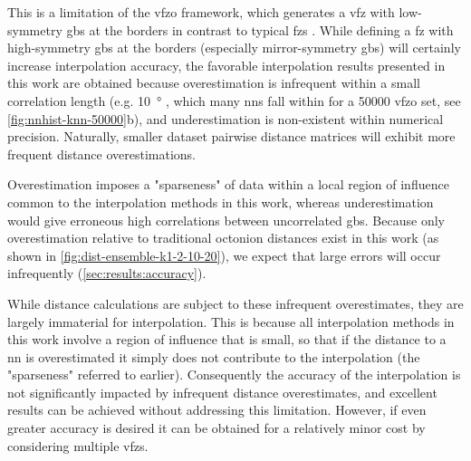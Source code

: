 \documentclass[final,twocolumn,12pt]{elsarticle}
\begin{document}
This is a limitation of the \gls{vfzo} framework, which generates a \gls{vfz} with low-symmetry \glspl{gb} at the borders in contrast to typical \glspl{fz} \cite{patalaSymmetriesRepresentationGrain2013,homerGrainBoundaryPlane2015}. While defining a \gls{fz} with high-symmetry \glspl{gb} at the borders (especially mirror-symmetry \glspl{gb}) will certainly increase interpolation accuracy, the favorable interpolation results presented in this work are obtained because overestimation is infrequent within a small correlation length (e.g. \SI{10}{\degree} \cite{olmstedSurveyComputedGrain2009}, which many \glspl{nn} fall within for a \num{50000} \gls{vfzo} set, see \cref{fig:nnhist-knn-50000}b), and underestimation is non-existent within numerical precision. Naturally, smaller dataset pairwise distance matrices will exhibit more frequent distance overestimations.

Overestimation imposes a "sparseness" of data within a local region of influence common to the interpolation methods in this work, whereas underestimation would give erroneous high correlations between uncorrelated \glspl{gb}. Because only overestimation relative to traditional octonion distances exist in this work (as shown in \cref{fig:dist-ensemble-k1-2-10-20}), we expect that large errors will occur infrequently (\cref{sec:results:accuracy}). %

While distance calculations are subject to these infrequent overestimates, they are largely immaterial for interpolation. This is because all interpolation methods in this work involve a region of influence that is small, so that if the distance to a \gls{nn} is overestimated it simply does not contribute to the interpolation (the "sparseness" referred to earlier). Consequently the accuracy of the interpolation is not significantly impacted by infrequent distance overestimates, and excellent results can be achieved without addressing this limitation. However, if even greater accuracy is desired it can be obtained for a relatively minor cost by considering multiple \glspl{vfz}.
\end{document}
